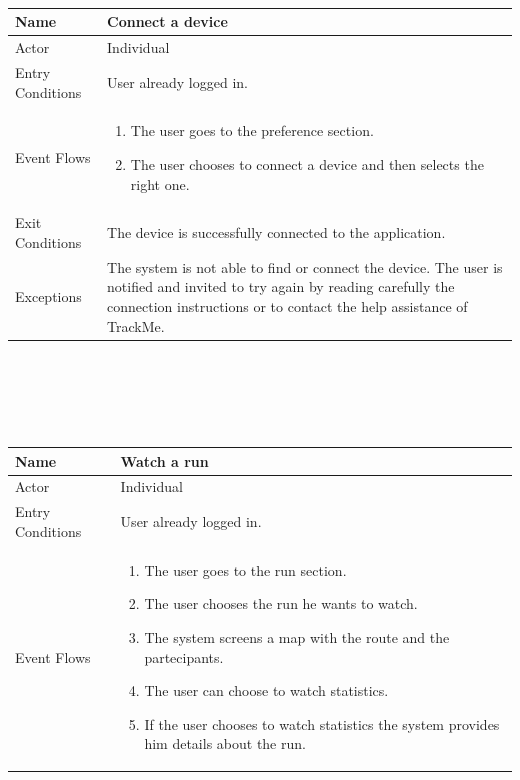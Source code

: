 \documentclass{article}
\begin{document}
\begin{legal}
\begin{legal}
\begin{legal}
\begin{tabular}{| m{3.5cm} | m{8cm}| }
				\end{tabular}\\\\\\
				\begin{tabular}{| m{3.5cm} | m{8cm}| }
				\hline
					Name & Connect a device\\
				\hline
					Actor & Individual\\
				\hline
					Entry Conditions & User already logged in.\\
				\hline
					Event Flows & \begin{enumerate}
									\item The user goes to the preference section.
									\item The user chooses to connect a device and then selects the right one.
				\end{enumerate}\\
				\hline
					Exit Conditions & The device is successfully connected to the application.\\
				\hline
					Exceptions & The system is not able to find or connect the device. The user is notified and invited to try again by reading carefully the connection instructions or to contact the help assistance of TrackMe.\\
				\hline
				\end{tabular}\\
				\\\\\\
				\begin{tabular}{| m{3.5cm} | m{8cm}| }
				\hline
					Name & Watch a run\\
				\hline
					Actor & Individual\\
				\hline
					Entry Conditions & User already logged in.\\
				\hline
					Event Flows & \begin{enumerate}
									\item The user goes to the run section.
									\item The user chooses the run he wants to watch.
									\item The system screens a map with the route and the partecipants.
									\item The user can choose to watch statistics.
									\item If the user chooses to watch statistics the system provides him details about the run.
				\end{enumerate}\\

\end{tabular}
\end{legal}
\end{legal}
\end{legal}
\end{document}
